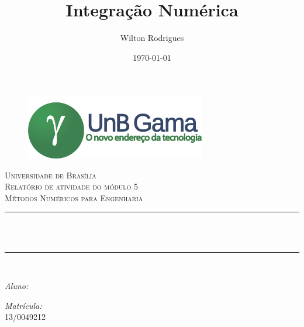 \documentclass[12pt, hidelinks]{article}
\title{Integração Numérica}         %
\author{Wilton Rodrigues}								%
\date{\today}											      %
\makeatletter
\let\thetitle\@title
\let\theauthor\@author
\let\thedate\@date
\makeatother
\begin{document}

\begin{titlepage}
  \centering
  \begin{figure}[H]
    \centering
    \includegraphics[width=0.7\textwidth]{figuras/logo.png}\\[2.0 cm]
  \end{figure}
  \textsc{\LARGE Universidade de Brasília}\\[2.5 cm]	%
  \textsc{\Large Relatório de atividade do módulo 5}\\[0.5 cm]				%
  \textsc{\large Métodos Numéricos para Engenharia}\\[1.5 cm]				%
  \rule{\linewidth}{0.2 mm} \\[0.4 cm]
  {\huge \bfseries \thetitle}\\
  \rule{\linewidth}{0.2 mm} \\[2.5 cm]

  \begin{minipage}{0.4\textwidth}
    \begin{flushleft} \large
      \emph{Aluno:}\\
      \theauthor
    \end{flushleft}
  \end{minipage}
  \begin{minipage}{0.4\textwidth}
    \begin{flushright} \large
      \emph{Matrícula:} \\
      13/0049212									%
    \end{flushright}
  \end{minipage}\\
  \vspace*{0.5in}
  {\large \thedate}\\[0.5 cm]

  \vfill

\end{titlepage}

\end{document}
